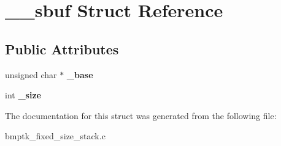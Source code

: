 \hypertarget{struct____sbuf}{}\section{\+\_\+\+\_\+sbuf Struct Reference}
\label{struct____sbuf}
\subsection*{Public Attributes}
\begin{DoxyCompactItemize}
\item 
unsigned char $\ast$ {\bfseries \+\_\+base}\hypertarget{struct____sbuf_a1a3f5fa2bf39a51a3a8e3819d2615042}{}\label{struct____sbuf_a1a3f5fa2bf39a51a3a8e3819d2615042}

\item 
int {\bfseries \+\_\+size}\hypertarget{struct____sbuf_a1d067106df46140c6cc00023910acb2d}{}\label{struct____sbuf_a1d067106df46140c6cc00023910acb2d}

\end{DoxyCompactItemize}


The documentation for this struct was generated from the following file\+:\begin{DoxyCompactItemize}
\item 
bmptk\+\_\+fixed\+\_\+size\+\_\+stack.\+c\end{DoxyCompactItemize}
